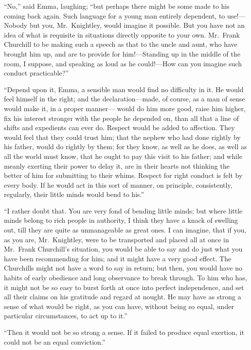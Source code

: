 ``No,'' said Emma, laughing; ``but perhaps there might be some made to his
coming back again.  Such language for a young man entirely dependent,
to use!---Nobody but you, Mr.\ Knightley, would imagine it possible.
But you have not an idea of what is requisite in situations directly
opposite to your own.  Mr.\ Frank Churchill to be making such
a speech as that to the uncle and aunt, who have brought him up,
and are to provide for him!---Standing up in the middle of the room,
I suppose, and speaking as loud as he could!---How can you imagine
such conduct practicable?''

``Depend upon it, Emma, a sensible man would find no difficulty in it.
He would feel himself in the right; and the declaration---made,
of course, as a man of sense would make it, in a proper manner---%
would do him more good, raise him higher, fix his interest stronger
with the people he depended on, than all that a line of shifts
and expedients can ever do.  Respect would be added to affection.
They would feel that they could trust him; that the nephew who had
done rightly by his father, would do rightly by them; for they know,
as well as he does, as well as all the world must know, that he
ought to pay this visit to his father; and while meanly exerting
their power to delay it, are in their hearts not thinking the better
of him for submitting to their whims.  Respect for right conduct
is felt by every body.  If he would act in this sort of manner,
on principle, consistently, regularly, their little minds would bend
to his.''

``I rather doubt that.  You are very fond of bending little minds;
but where little minds belong to rich people in authority,
I think they have a knack of swelling out, till they are quite as
unmanageable as great ones.  I can imagine, that if you, as you are,
Mr.\ Knightley, were to be transported and placed all at once in
Mr.\ Frank Churchill's situation, you would be able to say and do
just what you have been recommending for him; and it might have
a very good effect.  The Churchills might not have a word to say
in return; but then, you would have no habits of early obedience
and long observance to break through.  To him who has, it might
not be so easy to burst forth at once into perfect independence,
and set all their claims on his gratitude and regard at nought.
He may have as strong a sense of what would be right, as you can have,
without being so equal, under particular circumstances, to act up
to it.''

``Then it would not be so strong a sense.  If it failed to produce
equal exertion, it could not be an equal conviction.''

